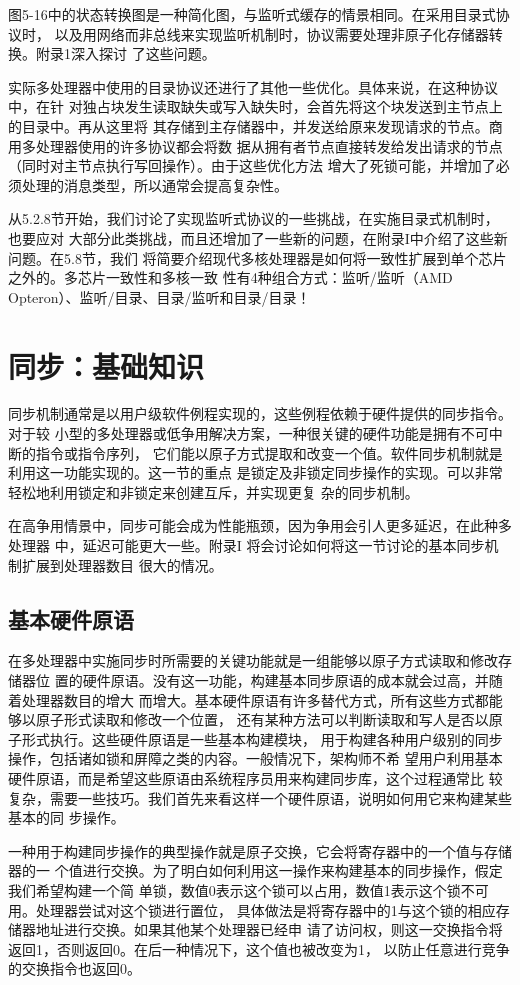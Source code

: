 图5-16中的状态转换图是一种简化图，与监听式缓存的情景相同。在采用目录式协议时，
以及用网络而非总线来实现监听机制时，协议需要处理非原子化存储器转换。附录1深入探讨
了这些问题。

实际多处理器中使用的目录协议还进行了其他一些优化。具体来说，在这种协议中，在针
对独占块发生读取缺失或写入缺失时，会首先将这个块发送到主节点上的目录中。再从这里将
其存储到主存储器中，并发送给原来发现请求的节点。商用多处理器使用的许多协议都会将数
据从拥有者节点直接转发给发出请求的节点（同时对主节点执行写回操作）。由于这些优化方法
增大了死锁可能，并增加了必须处理的消息类型，所以通常会提高复杂性。

从5.2.8节开始，我们讨论了实现监听式协议的一些挑战，在实施目录式机制时，也要应对
大部分此类挑战，而且还增加了一些新的问题，在附录I中介绍了这些新问题。在5.8节，我们
将简要介绍现代多核处理器是如何将一致性扩展到单个芯片之外的。多芯片一致性和多核一致
性有4种组合方式：监听/监听（AMD Opteron）、监听/目录、目录/监听和目录/目录！

\section{同步：基础知识}
同步机制通常是以用户级软件例程实现的，这些例程依赖于硬件提供的同步指令。对于较
小型的多处理器或低争用解决方案，一种很关键的硬件功能是拥有不可中断的指令或指令序列，
它们能以原子方式提取和改变一个值。软件同步机制就是利用这一功能实现的。这一节的重点
是锁定及非锁定同步操作的实现。可以非常轻松地利用锁定和非锁定来创建互斥，并实现更复
杂的同步机制。

在高争用情景中，同步可能会成为性能瓶颈，因为争用会引人更多延迟，在此种多处理器
中，延迟可能更大一些。附录I 将会讨论如何将这一节讨论的基本同步机制扩展到处理器数目
很大的情况。
\subsection{基本硬件原语}
在多处理器中实施同步时所需要的关键功能就是一组能够以原子方式读取和修改存储器位
置的硬件原语。没有这一功能，构建基本同步原语的成本就会过高，并随着处理器数目的增大
而增大。基本硬件原语有许多替代方式，所有这些方式都能够以原子形式读取和修改一个位置，
还有某种方法可以判断读取和写人是否以原子形式执行。这些硬件原语是一些基本构建模块，
用于构建各种用户级别的同步操作，包括诸如锁和屏障之类的内容。一般情况下，架构师不希
望用户利用基本硬件原语，而是希望这些原语由系统程序员用来构建同步库，这个过程通常比
较复杂，需要一些技巧。我们首先来看这样一个硬件原语，说明如何用它来构建某些基本的同
步操作。

一种用于构建同步操作的典型操作就是原子交换，它会将寄存器中的一个值与存储器的一
个值进行交换。为了明白如何利用这一操作来构建基本的同步操作，假定我们希望构建一个简
单锁，数值0表示这个锁可以占用，数值1表示这个锁不可用。处理器尝试对这个锁进行置位，
具体做法是将寄存器中的1与这个锁的相应存储器地址进行交换。如果其他某个处理器已经申
请了访问权，则这一交换指令将返回1，否则返回0。在后一种情况下，这个值也被改变为1，
以防止任意进行竞争的交换指令也返回0。

